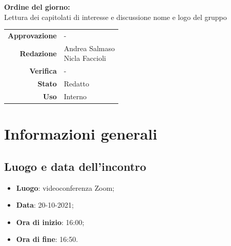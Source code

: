 \documentclass[11pt]{article}
\begin{document}
\begin{titlepage}
\begin{center}
			\large
			
			\vfill
			\textbf{Ordine del giorno:} \\
			Lettura dei capitolati di interesse e discussione nome e logo del gruppo
			
			
			\vfill
			
			
			\begin{tabular}{r|l}
				\textbf{Approvazione} &  -\\
				\textbf{Redazione} &  \parbox[t]{5cm}{Andrea Salmaso \\Nicla Faccioli}\\
				\textbf{Verifica} &  -\\
				\textbf{Stato} & Redatto \\
				\textbf{Uso} & Interno
			\end{tabular}
			\vfill
			
		\end{center}
	\end{titlepage}

	\section{Informazioni generali}
	\subsection{Luogo e data dell'incontro}
	\begin{itemize}
		\item \textbf{Luogo}: videoconferenza Zoom;
		\item \textbf{Data}: 20-10-2021;
		\item \textbf{Ora di inizio}: 16:00;
		\item \textbf{Ora di fine}: 16:50.
	\end{itemize}
	
\end{document}
